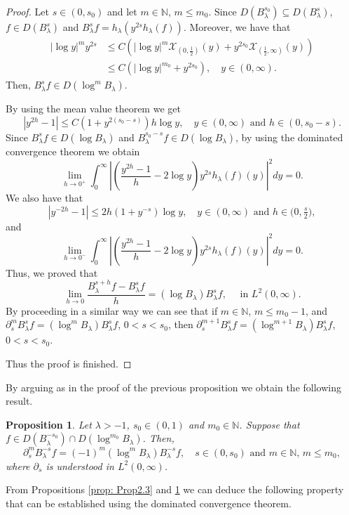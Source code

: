 \documentclass[a4paper,10pt, reqno]{amsart}
\newtheorem{prop}[thm]{Proposition}
\theoremstyle{definition}
\theoremstyle{remark}
\numberwithin{equation}{section}
\begin{document}
\begin{proof}
    Let $s\in (0,s_0)$ and let $m\in \mathbb N$, $m \leq m_0$. Since $D( B_\lambda^{s_0})\subseteq D(B_\lambda^s)$, $f\in D(B_\lambda^s)$ and $B_\lambda^sf=h_\lambda (y^{2s}h_\lambda (f))$. Moreover, we have that
    \begin{align*}
        |\log y|^m y^{2s}&\leq C\left(|\log y|^m\mathcal X_{(0,\tfrac12)}(y)+y ^{2s_0}\mathcal X_{(\tfrac12,\infty)}(y)\right)\\
        &\leq C\left(|\log y|^{m_0}+y^{2s_0}\right),\quad y\in (0,\infty).
    \end{align*}
Then, $B_\lambda^sf\in D(\log^m B_\lambda)$.

By using the mean value theorem we get
\[
|y^{2h}-1|\leq C\left(1+y^{2(s_0-s)}\right)h\log y,\quad y\in (0,\infty)\mbox{ and }h\in (0,s_0-s).
\]
Since $B_\lambda^sf\in D(\log B_\lambda)$ and $B_\lambda^{s_0-s}f\in D(\log B_\lambda)$, by using the dominated convergence theorem we obtain
\[
\lim_{h\rightarrow 0^+}\int_0^\infty \left|\left(\frac{y^{2h}-1}{h}-2\log y\right)y^{2s}h_\lambda (f)(y)\right|^2dy=0.
\]
We also have that
\[
|y^{-2h}-1|\leq 2h(1+y^{-s})\log y,\quad y\in (0,\infty)\mbox{ and }h\in \big(0,\tfrac{s}{2}\big),
\]
and
\[
\lim_{h\rightarrow 0^-}\int_0^\infty \left|\left(\frac{y^{2h}-1}{h}-2\log y\right)y^{2s}h_\lambda (f)(y)\right|^2dy=0.
\]
Thus, we proved that
\[
\lim_{h\rightarrow 0}\frac{B_\lambda^{s+h}f-B_\lambda^sf}{h}=(\log B_\lambda)B_\lambda^sf,\quad \mbox{ in }L^2(0,\infty).
\]
By proceeding in a similar way we can see that if $m\in \mathbb N$, $m\leq m_0-1$, and $\partial_s^m B_\lambda^sf=(\log^m B_\lambda)B_\lambda^sf$, $0<s<s_0$, then $\partial_s^{m+1}B_\lambda^sf=(\log^{m+1}B_\lambda)B_\lambda^s f$, $0<s<s_0$.

Thus the proof is finished.
\end{proof}
By arguing as in the proof of the previous proposition we obtain the following result.

\begin{prop}\label{prop: Prop2.4}
    Let $\lambda >-1$, $s_0\in (0,1)$ and $m_0\in \mathbb N$. Suppose that $f\in D(B_\lambda^{-s_0})\cap D(\log^{m_0}B_\lambda)$. Then, 
    \[
    \partial_s^m B_\lambda^{-s}f=(-1)^m(\log^m B_\lambda)B_\lambda^{-s}f,\quad s\in (0,s_0)\mbox{ and }m\in \mathbb N,\,m\leq m_0,
    \] 
    where $\partial_s$ is understood in $L^2(0,\infty)$.
\end{prop}

From Propositions \ref{prop: Prop2.3} and \ref{prop: Prop2.4} we can deduce the following property that can be established using the dominated convergence theorem.
\end{document}
